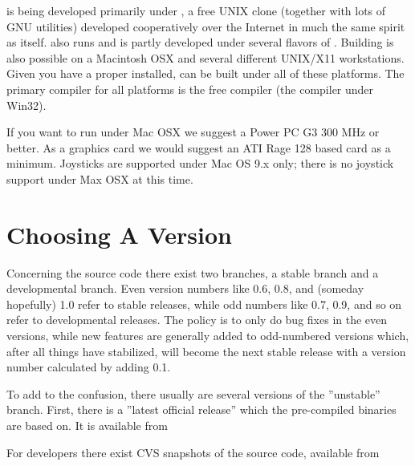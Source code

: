 \FlightGear{} is being developed primarily under , a free UNIX clone
(together with lots of GNU utilities) developed cooperatively over the Internet in much
the same spirit as \FlightGear{} itself. \FlightGear{} also runs and is partly developed
under several flavors of . Building \FlightGear{} is also possible on a Macintosh OSX
and several different UNIX/X11 workstations. Given you have a proper  installed,
\FlightGear{} can be built under all of these platforms. The primary compiler for all platforms is
the free  compiler (the   compiler under Win32).

If you want to run \FlightGear{} under Mac OSX we suggest a Power PC G3 300 MHz or better. As a
graphics card we would suggest an ATI Rage 128 based card as a minimum. Joysticks are supported
under Mac OS 9.x only; there is no joystick support under Max OSX at this time.


\section{Choosing A Version}

Concerning the \FlightGear{} source code there exist two branches, a stable branch and a
developmental branch. Even version numbers
like 0.6, 0.8, and (someday hopefully) 1.0 refer to stable releases, while odd
numbers like 0.7, 0.9, and so on refer to developmental releases. The policy is to only do
bug fixes in the even versions, while new features are generally added to odd-numbered
versions which, after all things have stabilized, will become the next stable release
with a version number calculated by adding 0.1.\label{branches}

To add to the confusion, there usually are several versions of the ''unstable''
branch. First, there is a ''latest official release'' which the pre-compiled binaries are based
on.  It is available from
\medskip

\medskip

For developers there exist CVS snapshots of the
source code, available from
 \medskip

